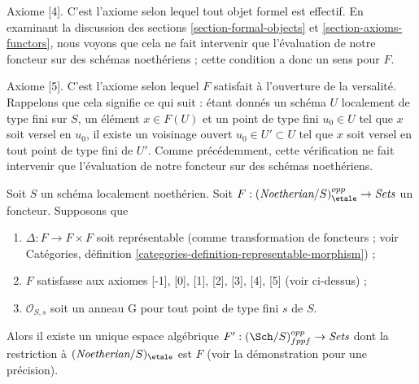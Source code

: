 \medskip\noindent
Axiome [4]. C'est l'axiome selon lequel tout objet formel est effectif. En
examinant la discussion des sections \ref{section-formal-objects} et
\ref{section-axioms-functors}, nous voyons que cela ne fait intervenir que
l'évaluation de notre foncteur sur des schémas noethériens ; cette condition a
donc un sens pour $F$.

\medskip\noindent
Axiome [5]. C'est l'axiome selon lequel $F$ satisfait à l'ouverture de la
versalité. Rappelons que cela signifie ce qui suit : étant donnés un schéma $U$
localement de type fini sur $S$, un élément $x \in F(U)$ et un point de type
fini $u_0 \in U$ tel que $x$ soit versel en $u_0$, il existe un voisinage
ouvert $u_0 \in U' \subset U$ tel que $x$ soit versel en tout point de type
fini de $U'$. Comme précédemment, cette vérification ne fait intervenir que
l'évaluation de notre foncteur sur des schémas noethériens.

\begin{proposition}
\label{proposition-spaces-diagonal-representable-noetherian}
Soit $S$ un schéma localement noethérien. Soit
$F : (\textit{Noetherian}/S)_\etale^{opp} \to \textit{Sets}$
un foncteur. Supposons que
\begin{enumerate}
\item $\Delta : F \to F \times F$ soit représentable (comme transformation de
foncteurs ; voir Catégories, définition
\ref{categories-definition-representable-morphism}) ;
\item $F$ satisfasse aux axiomes [-1], [0], [1], [2], [3], [4], [5]
(voir ci-dessus) ;
\item $\mathcal{O}_{S, s}$ soit un anneau G pour tout point de type fini $s$ de
$S$.
\end{enumerate}
Alors il existe un unique espace algébrique
$F' : (\Sch/S)_{fppf}^{opp} \to \textit{Sets}$
dont la restriction à $(\textit{Noetherian}/S)_\etale$ est $F$ (voir la
démonstration pour une précision).
\end{proposition}

